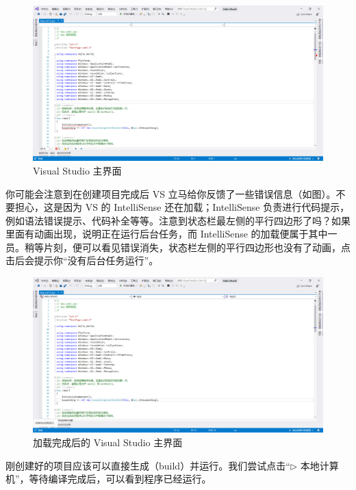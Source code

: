 \begin{figure}[htbp]
    \centering
    \includegraphics[width = 0.75\paperwidth]{pic/6.png}
    \caption{Visual Studio 主界面}
\end{figure}

你可能会注意到在创建项目完成后 VS 立马给你反馈了一些错误信息（如图）。不要担心，这是因为 VS 的 IntelliSense 还在加载；IntelliSense 负责进行代码提示，例如语法错误提示、代码补全等等。注意到状态栏最左侧的平行四边形了吗？如果里面有动画出现，说明正在运行后台任务，而 IntelliSense 的加载便属于其中一员。稍等片刻，便可以看见错误消失，状态栏左侧的平行四边形也没有了动画，点击后会提示你``没有后台任务运行''。

\begin{figure}[htbp]
    \centering
    \includegraphics[width = 0.75\paperwidth]{pic/7.png}
    \caption{加载完成后的 Visual Studio 主界面}
\end{figure}

刚创建好的项目应该可以直接生成（build）并运行。我们尝试点击``{\Large$\triangleright$} 本地计算机''，等待编译完成后，可以看到程序已经运行。


